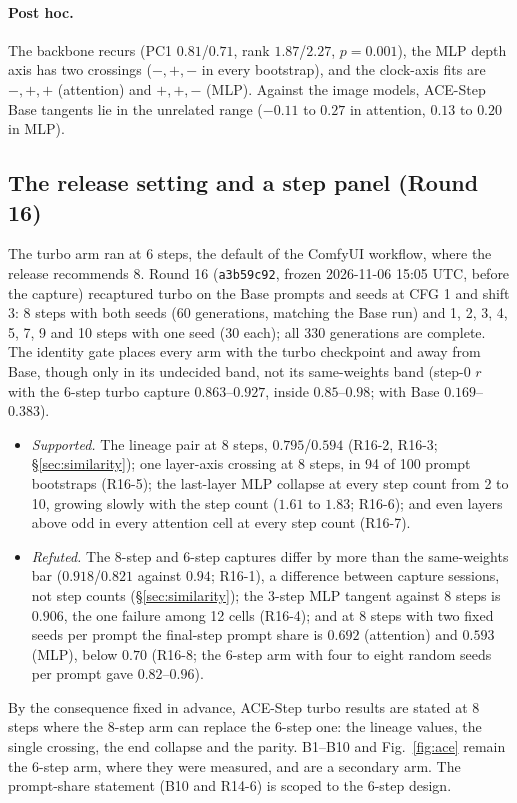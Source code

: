 \documentclass[11pt]{article}
\begin{document}
\paragraph{Post hoc.} The backbone recurs (PC1 $0.81$/$0.71$, rank $1.87$/$2.27$, $p=0.001$), the MLP depth axis has two crossings ($-,+,-$ in every bootstrap), and the clock-axis fits are $-,+,+$ (attention) and $+,+,-$ (MLP). Against the image models, ACE-Step Base tangents lie in the unrelated range ($-0.11$ to $0.27$ in attention, $0.13$ to $0.20$ in MLP).

\subsection{The release setting and a step panel (Round 16)}\label{sec:ace16}
The turbo arm ran at 6 steps, the default of the ComfyUI workflow, where the release recommends 8. Round 16 (\texttt{a3b59c92}, frozen 2026-11-06 15:05 UTC, before the capture) recaptured turbo on the Base prompts and seeds at CFG 1 and shift 3: 8 steps with both seeds (60 generations, matching the Base run) and 1, 2, 3, 4, 5, 7, 9 and 10 steps with one seed (30 each); all 330 generations are complete. The identity gate places every arm with the turbo checkpoint and away from Base, though only in its undecided band, not its same-weights band (step-0 $r$ with the 6-step turbo capture $0.863$--$0.927$, inside $0.85$--$0.98$; with Base $0.169$--$0.383$).
\begin{itemize}
 \item \emph{Supported.} The lineage pair at 8 steps, $0.795$/$0.594$ (R16-2, R16-3; \S\ref{sec:similarity}); one layer-axis crossing at 8 steps, in 94 of 100 prompt bootstraps (R16-5); the last-layer MLP collapse at every step count from 2 to 10, growing slowly with the step count ($1.61$ to $1.83$; R16-6); and even layers above odd in every attention cell at every step count (R16-7).
 \item \emph{Refuted.} The 8-step and 6-step captures differ by more than the same-weights bar ($0.918$/$0.821$ against $0.94$; R16-1), a difference between capture sessions, not step counts (\S\ref{sec:similarity}); the 3-step MLP tangent against 8 steps is $0.906$, the one failure among 12 cells (R16-4); and at 8 steps with two fixed seeds per prompt the final-step prompt share is $0.692$ (attention) and $0.593$ (MLP), below $0.70$ (R16-8; the 6-step arm with four to eight random seeds per prompt gave $0.82$--$0.96$).
\end{itemize}
By the consequence fixed in advance, ACE-Step turbo results are stated at 8 steps where the 8-step arm can replace the 6-step one: the lineage values, the single crossing, the end collapse and the parity. B1--B10 and Fig.~\ref{fig:ace} remain the 6-step arm, where they were measured, and are a secondary arm. The prompt-share statement (B10 and R14-6) is scoped to the 6-step design.
\end{document}
